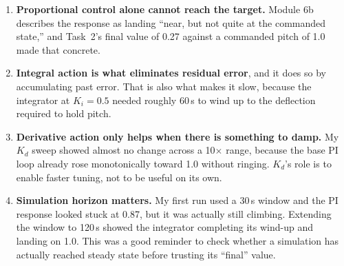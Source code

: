 \documentclass[11pt,letterpaper]{article}
\begin{document}
\begin{enumerate}
  \item \textbf{Proportional control alone cannot reach the target.}
  Module 6b describes the response as landing ``near, but not quite at the
  commanded state,'' and Task~2's final value of 0.27 against a commanded
  pitch of 1.0 made that concrete.
  \item \textbf{Integral action is what eliminates residual error}, and it
  does so by accumulating past error. That is also what makes it slow,
  because the integrator at $K_{i}=0.5$ needed roughly 60\,s to wind up to
  the deflection required to hold pitch.
  \item \textbf{Derivative action only helps when there is something to
  damp.} My $K_{d}$ sweep showed almost no change across a 10$\times$
  range, because the base PI loop already rose monotonically toward 1.0
  without ringing. $K_{d}$'s role is to enable faster tuning, not to be
  useful on its own.
  \item \textbf{Simulation horizon matters.} My first run used a 30\,s
  window and the PI response looked stuck at 0.87, but it was actually
  still climbing. Extending the window to 120\,s showed the integrator
  completing its wind-up and landing on 1.0. This was a good reminder to
  check whether a simulation has actually reached steady state before
  trusting its ``final'' value.
\end{enumerate}
\end{document}
